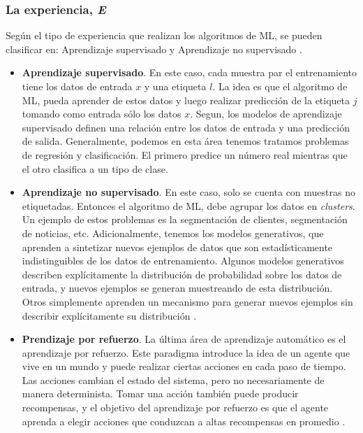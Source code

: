 \subsubsection{La experiencia, \textit{E}}

Según el tipo de experiencia que realizan los algoritmos de ML, se pueden clasificar en: Aprendizaje supervisado y Aprendizaje no supervisado \cite{Goodfellow2016}.

\begin{itemize}
	\item \textbf{Aprendizaje supervisado}. En este caso, cada muestra par el entrenamiento tiene los datos de entrada $x$ y una etiqueta $l$. La idea es que el algoritmo de ML, pueda aprender de estos datos y luego realizar predicción de la etiqueta $j$ tomando como entrada sólo los datos $x$. Segun, \cite{prince2023understanding} los modelos de aprendizaje supervisado definen una relación entre los datos de entrada y una predicción de salida. Generalmente, podemos en esta área tenemos tratamos problemas de regresión y clasificación. El primero predice un número real mientras que el otro clasifica a un tipo de clase.
	
	\item \textbf{Aprendizaje no supervisado}. En este caso, solo se cuenta con muestras no etiquetadas. Entonces el algoritmo   de ML, debe agrupar los datos en \textit{clusters}. Un ejemplo de estos problemas es la segmentación de clientes, segmentación de noticias, etc. Adicionalmente, tenemos los modelos generativos, que aprenden a sintetizar nuevos ejemplos de datos que son estadísticamente indistinguibles de los datos de entrenamiento. Algunos modelos generativos describen explícitamente la distribución de probabilidad sobre los datos de entrada, y nuevos ejemplos se generan muestreando de esta distribución. Otros simplemente aprenden un mecanismo para generar nuevos ejemplos sin describir explícitamente su distribución \citep{prince2023understanding}.
	
	\item \textbf{Prendizaje por refuerzo}. La última área de aprendizaje automático es el aprendizaje por refuerzo. Este paradigma introduce la idea de un agente que vive en un mundo y puede realizar ciertas acciones en cada paso de tiempo. Las acciones cambian el estado del sistema, pero no necesariamente de manera determinista. Tomar una acción también puede producir recompensas, y el objetivo del aprendizaje por refuerzo es que el agente aprenda a elegir acciones que conduzcan a altas recompensas en promedio \citep{prince2023understanding}.
	
\end{itemize}


